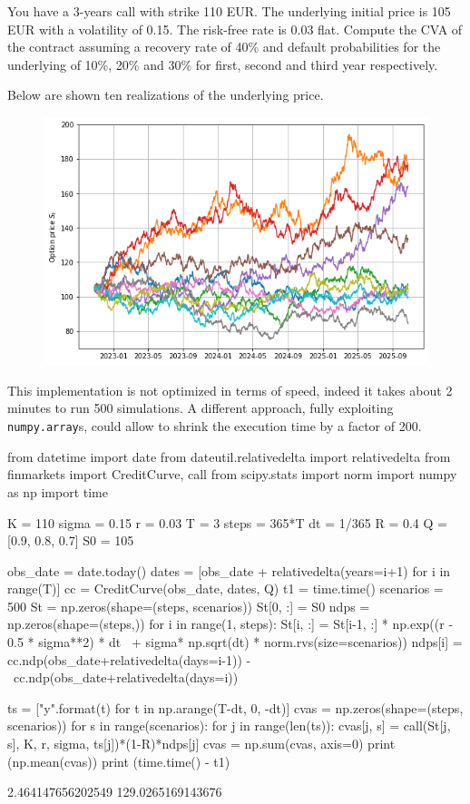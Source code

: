 \begin{question}
You have a 3-years call with strike 110 EUR. The underlying initial price is 105 EUR with a volatility of 0.15. The risk-free rate is 0.03 flat.
Compute the CVA of the contract assuming a recovery rate of 40\% and default probabilities for the underlying of 10\%, 20\% and 30\% for first, second and third year respectively.
\end{question}

\cprotEnv\begin{solution}
Below are shown ten realizations of the underlying price.

\begin{figure}[htbp]
\centering
\includegraphics[width=0.7\linewidth]{figures/underlying_simulation}
\end{figure}

This implementation is not optimized in terms of speed, indeed it takes about 2 minutes to run 500 simulations.
A different approach, fully exploiting \texttt{numpy.array}s, could allow to shrink the execution time by a factor of 200.

\begin{ipython}
from datetime import date
from dateutil.relativedelta import relativedelta
from finmarkets import CreditCurve, call
from scipy.stats import norm
import numpy as np
import time

K = 110
sigma = 0.15
r = 0.03
T = 3
steps = 365*T
dt = 1/365
R = 0.4
Q = [0.9, 0.8, 0.7]
S0 = 105

obs_date = date.today()
dates = [obs_date + relativedelta(years=i+1) for i in range(T)]
cc = CreditCurve(obs_date, dates, Q)
t1 = time.time()
scenarios = 500
St = np.zeros(shape=(steps, scenarios))
St[0, :] = S0
ndps = np.zeros(shape=(steps,))
for i in range(1, steps):
    St[i, :] = St[i-1, :] * np.exp((r - 0.5 * sigma**2) * dt \
        + sigma* np.sqrt(dt) * norm.rvs(size=scenarios))
    ndps[i] = cc.ndp(obs_date+relativedelta(days=i-1)) - \
        cc.ndp(obs_date+relativedelta(days=i))

ts = ["{}y".format(t) for t in np.arange(T-dt, 0, -dt)]
cvas = np.zeros(shape=(steps, scenarios))
for s in range(scenarios):
    for j in range(len(ts)):
        cvas[j, s] = call(St[j, s], K, r, sigma, ts[j])*(1-R)*ndps[j]
cvas = np.sum(cvas, axis=0)
print (np.mean(cvas))
print (time.time() - t1)
\end{ipython}
\begin{ioutput}
2.464147656202549
129.0265169143676
\end{ioutput}
\end{solution}

